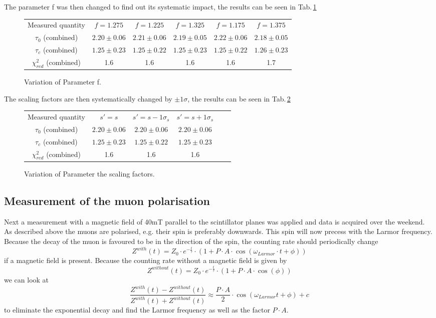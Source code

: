 The parameter f was then changed to find out its systematic impact, the results can be seen in Tab.\,\ref{t:varf}
\begin{figure}
\begin{tabularx}{\textwidth}{| c | c | c | c | c | c |}
Measured quantity & $f=1.275$ & $f = 1.225$ & $f=1.325$ & $f = 1.175$ & $f = 1.375$\\
$\tau_0$ (combined) & $2.20\pm0.06$ & $2.21\pm0.06$ & $2.19\pm0.05$ & $2.22\pm0.06$ & $2.18\pm0.05$ \\
$\tau_c$ (combined) & $1.25\pm0.23$ & $1.25\pm0.22$ & $1.25\pm0.23$ & $1.25\pm0.22$ & $1.26\pm0.23$ \\
$\chi^2_{red}$ (combined) & 1.6 & 1.6 & 1.6 & 1.6 & 1.7
\end{tabularx}
\caption{Variation of Parameter f.}
\label{t:varf}
\end{figure}

The scaling factors are then systematically changed by $\pm1\sigma$, the results can be seen in Tab.\,\ref{t:vars}
\begin{figure}
\begin{tabularx}{\textwidth}{| c | c | c | c | c | c |}
Measured quantity & $s' = s$  & $s' = s-1\sigma_s$ & $s' = s+1\sigma_s$ \\
$\tau_0$ (combined) & $2.20\pm0.06$ & $2.20\pm0.06$ & $2.20\pm0.06$ \\
$\tau_c$ (combined) & $1.25\pm0.23$ & $1.25\pm0.22$ & $1.25\pm0.23$ \\  
$\chi^2_{red}$ (combined) & 1.6 & 1.6 & 1.6
\end{tabularx}
\caption{Variation of Parameter the scaling factors.}
\label{t:vars}
\end{figure}

\subsection{Measurement of the muon polarisation}
Next a measurement with a magnetic field of 40mT parallel to the scintillator planes was applied and data is acquired over the weekend. As described above the muons are polarised, e.g. their spin is preferably downwards. This spin will now precess with the Larmor frequency. Because the decay of the muon is favoured to be in the direction of the spin, the counting rate should periodically change
\begin{equation}
	Z^{with}(t)=Z_0\cdot e^{-\frac{t}{\tau}}\cdot(1+P\cdot A\cdot\cos(\omega_{Larmor}\cdot t +\phi))
\end{equation}
if a magnetic field is present. Because the counting rate without a magnetic field is given by 
\begin{equation}
	Z^{without}(t) = Z_0\cdot e^{-\frac{t}{\tau}}\cdot(1+P\cdot A\cdot\cos(\phi))
\end{equation}
we can look at 
\begin{equation}
	\frac{Z^{with}(t)-Z^{without}(t)}{Z^{with}(t)+Z^{without}(t)}\approx \frac{P\cdot A}{2}\cdot \cos(\omega_{Larmor}t+\phi)+c
\end{equation}
to eliminate the exponential decay and find the Larmor frequency as well as the factor $P\cdot A$. 

